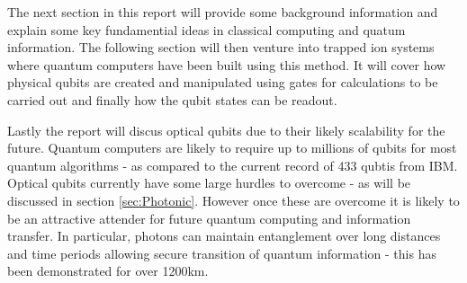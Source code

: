 The next section in this report will provide some background information and explain some key fundamential ideas in classical computing and quatum information. 
The following section will then venture into trapped ion systems where quantum computers have been built using this method.
It will cover how physical qubits are created and manipulated using gates for calculations to be carried out and finally how the qubit states can be readout. 


Lastly the report will discus optical qubits due to their likely scalability for the future. 
Quantum computers are likely to require up to millions of qubits for most quantum algorithms - as compared to the current record of 433 qubtis from IBM. \cite{bergou_quantum_2021} 
Optical qubits currently have some large hurdles to overcome - as will be discussed in section \ref{sec:Photonic}. 
However once these are overcome it is likely to be an attractive attender for future quantum computing and information transfer.
In particular, photons can maintain entanglement over long distances and time periods allowing secure transition of quantum information - this has been demonstrated for over 1200km. \cite{yin_satellite-based_2017}